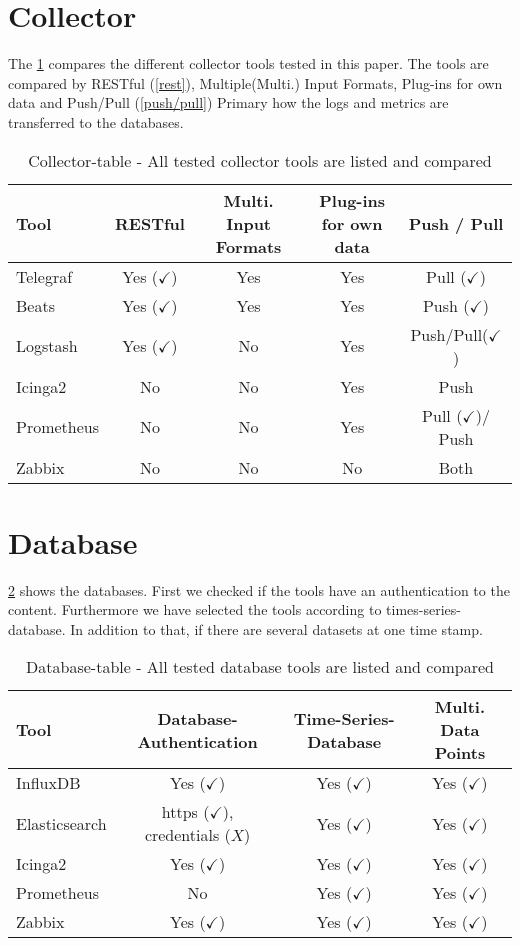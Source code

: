 \section{Collector}
The \cref{tab:Collector} compares the different collector tools tested in this paper. The tools are compared by RESTful (\cref{rest}), Multiple(Multi.) Input Formats, Plug-ins for own data and Push/Pull (\cref{push/pull}) Primary how the logs and metrics are transferred to the databases.
\begin{table}[H]
\centering
\begin{tabular}{lcccc}
\hline

Tool & RESTful & Multi. Input Formats      & Plug-ins for own data        & Push / Pull \\

\hline
Telegraf    & Yes ($ \checkmark $) & Yes    & Yes    &Pull    ($ \checkmark $)  \\
Beats  & Yes ($ \checkmark $)  & Yes & Yes  & Push ($ \checkmark $) \\
Logstash & Yes ($ \checkmark $)  & No & Yes & Push/Pull($\checkmark$)                         \\
Icinga2  & No  & No  & Yes  & Push \\
Prometheus  & No  & No  & Yes  & Pull ($ \checkmark $)/ Push\\
Zabbix & No  & No  & No  & Both \\
\hline                        
\end{tabular}
\caption{Collector-table - All tested collector tools are listed and compared}
\label{tab:Collector}
\end{table}

\section{Database}
\cref{tab:Database} shows the databases. First we checked if the tools have an authentication to the content. Furthermore we have selected the tools according to times-series-database. In addition to that, if there are several datasets at one time stamp. \\
\begin{table}[H]
\centering
\begin{tabular}{lccc}
	\hline
Tool & Database-Authentication     & Time-Series-Database          & Multi. Data Points        \\
\hline
InfluxDB  & Yes ($ \checkmark $) & Yes ($ \checkmark $)  & Yes ($ \checkmark $)\\
Elasticsearch & https ($ \checkmark $), credentials ($ X $) & Yes ($ \checkmark $) & Yes ($ \checkmark $)\\
Icinga2 & Yes ($ \checkmark $) & Yes ($ \checkmark $) & Yes ($ \checkmark $) \\
Prometheus& No & Yes ($ \checkmark $) & Yes ($ \checkmark $)\\
Zabbix& Yes ($ \checkmark $) & Yes ($ \checkmark $) & Yes ($ \checkmark $)\\
\hline
\end{tabular}
\caption{Database-table - All tested database tools are listed and compared}
\label{tab:Database}
\end{table}

